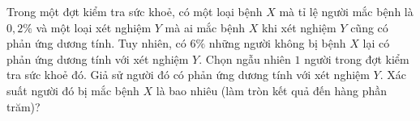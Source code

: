 \begin{ex}
Trong một đợt kiểm tra sức khoẻ, có một loại bệnh $X$ mà tỉ lệ người mắc bệnh là $0{,}2\%$ và một loại xét nghiệm $Y$ mà ai mắc bệnh $X$ khi xét nghiệm $Y$ cũng có phản ứng dương tính. Tuy nhiên, có $6\%$ những người không bị bệnh $X$ lại có phản ứng dương tính với xét nghiệm $Y$. Chọn ngẫu nhiên $1$ người trong đợt kiểm tra sức khoẻ đó. Giả sử người đó có phản ứng dương tính với xét nghiệm $Y$. Xác suất người đó bị mắc bệnh $X$ là bao nhiêu (làm tròn kết quả đến hàng phần trăm)?
\end{ex}
